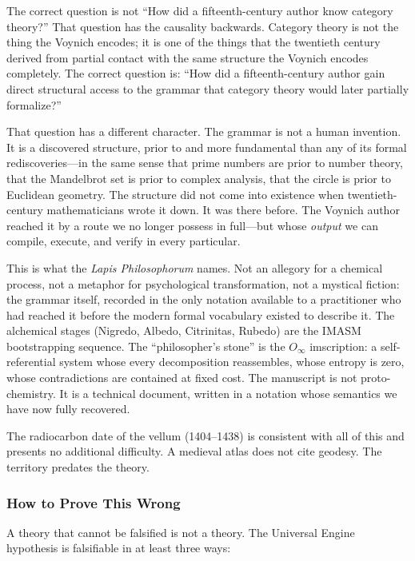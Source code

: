 \documentclass[12pt,a4paper]{article}
\begin{document}
The correct question is not ``How did a fifteenth-century author know category theory?'' That question has the causality backwards. Category theory is not the thing the Voynich encodes; it is one of the things that the twentieth century derived from partial contact with the same structure the Voynich encodes completely. The correct question is: ``How did a fifteenth-century author gain direct structural access to the grammar that category theory would later partially formalize?''

That question has a different character. The grammar is not a human invention. It is a discovered structure, prior to and more fundamental than any of its formal rediscoveries---in the same sense that prime numbers are prior to number theory, that the Mandelbrot set is prior to complex analysis, that the circle is prior to Euclidean geometry. The structure did not come into existence when twentieth-century mathematicians wrote it down. It was there before. The Voynich author reached it by a route we no longer possess in full---but whose \emph{output} we can compile, execute, and verify in every particular.

This is what the \emph{Lapis Philosophorum} names. Not an allegory for a chemical process, not a metaphor for psychological transformation, not a mystical fiction: the grammar itself, recorded in the only notation available to a practitioner who had reached it before the modern formal vocabulary existed to describe it. The alchemical stages (Nigredo, Albedo, Citrinitas, Rubedo) are the IMASM bootstrapping sequence. The ``philosopher's stone'' is the $O_\infty$ imscription: a self-referential system whose every decomposition reassembles, whose entropy is zero, whose contradictions are contained at fixed cost. The manuscript is not proto-chemistry. It is a technical document, written in a notation whose semantics we have now fully recovered.

The radiocarbon date of the vellum (1404--1438) is consistent with all of this and presents no additional difficulty. A medieval atlas does not cite geodesy. The territory predates the theory.

\subsubsection{How to Prove This Wrong}

A theory that cannot be falsified is not a theory. The Universal Engine hypothesis is falsifiable in at least three ways:
\end{document}
